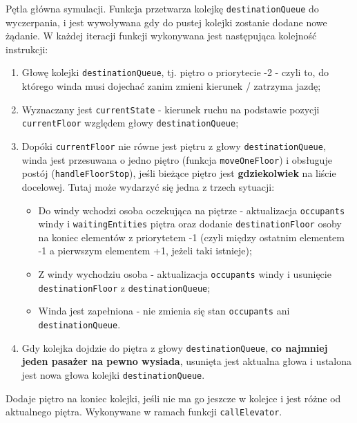 \documentclass[12pt, a4paper]{article}
\begin{document}
\begin{description}[leftmargin=1cm, style=nextline]
  \item[\texttt{processQueue(Division division)}]
    Pętla główna symulacji. Funkcja przetwarza kolejkę \texttt{destinationQueue} do wyczerpania, i jest wywoływana gdy do pustej kolejki zostanie dodane nowe żądanie. 
    W każdej iteracji funkcji wykonywana jest następująca kolejność instrukcji:
    \begin{enumerate}
        \item Głowę kolejki \texttt{destinationQueue}, tj. piętro o priorytecie -2 - czyli to, do którego winda musi dojechać zanim zmieni kierunek / zatrzyma jazdę;
        \item Wyznaczany jest \texttt{currentState} - kierunek ruchu na podstawie pozycji \texttt{currentFloor} względem głowy \texttt{destinationQueue};
        \item Dopóki \texttt{currentFloor} nie równe jest piętru z głowy \texttt{destinationQueue}, winda jest przesuwana o jedno piętro (funkcja \texttt{moveOneFloor}) 
                i obsługuje postój (\texttt{handleFloorStop}), jeśli bieżące piętro jest \textbf{gdziekolwiek} na liście docelowej. Tutaj może wydarzyć się jedna z trzech 
                sytuacji:
                \begin{itemize}
                    \item Do windy wchodzi osoba oczekująca na piętrze - aktualizacja \texttt{occupants} windy i \texttt{waitingEntities} piętra oraz dodanie 
                    \texttt{destinationFloor} osoby na koniec elementów z priorytetem -1 (czyli między ostatnim elementem -1 a pierwszym elementem +1, jeżeli taki istnieje);
                    \item Z windy wychodziu osoba - aktualizacja \texttt{occupants} windy i usunięcie \texttt{destinationFloor} z \texttt{destinationQueue};
                    \item Winda jest zapełniona - nie zmienia się stan \texttt{occupants} ani \texttt{destinationQueue}.
                \end{itemize}
        \item Gdy kolejka dojdzie do piętra z głowy \texttt{destinationQueue}, \textbf{co najmniej jeden pasażer na pewno wysiada}, usunięta jest aktualna głowa i ustalona jest 
                nowa głowa kolejki \texttt{destinationQueue}.
        \end{enumerate} 

\item[\texttt{enqueueDestination(int floor)}]
    Dodaje piętro na koniec kolejki, jeśli nie ma go jeszcze w kolejce i jest różne od aktualnego piętra. Wykonywane w ramach funkcji \texttt{callElevator}.


\end{description}
\end{document}
